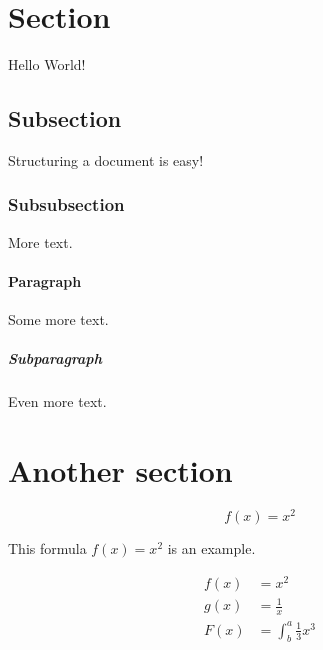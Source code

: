 \documentclass{article}
\begin{document}
\section{Section}

Hello World!

\subsection{Subsection}

Structuring a document is easy!

\subsubsection{Subsubsection}

More text.

\paragraph{Paragraph}

Some more text.

\subparagraph{Subparagraph}

Even more text.

\section{Another section}

\begin{equation*}
  f(x) = x^2
\end{equation*}

This formula $f(x) = x^2$ is an example.

\begin{align*}
  f(x) &= x^2\\
  g(x) &= \frac{1}{x}\\
  F(x) &= \int^a_b \frac{1}{3}x^3
\end{align*}
\end{document}
